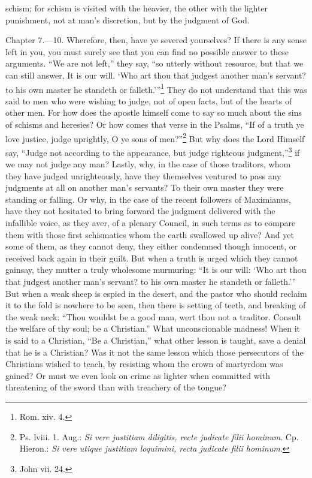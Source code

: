 schism; for schism is visited with the heavier, the other with the lighter punishment, not at man’s discretion, but by the judgment of God.


Chapter 7.—10. Wherefore, then, have ye severed yourselves? If there is any sense left in you, you must surely see that you can find no possible answer to these arguments. ``We are not left,'' they say, ``so utterly without resource, but that we can still answer, It is our will. ‘Who art thou that judgest another man’s servant? to his own master he standeth or falleth.’''\footnote{\par  Rom. xiv. 4.} They do not understand that this was said to men who were wishing to judge, not of open facts, but of the hearts of other men. For how does the apostle himself come to say so much about the sins of schisms and heresies? Or how comes that verse in the Psalms, ``If of a truth ye love justice, judge uprightly, O ye sons of men?''\footnote{\par  Ps. lviii. 1. Aug.: \emph{Si vere justitiam diligitis, recte judicate filii hominum}. Cp. Hieron.: \emph{Si vere utique justitiam loquimini, recta judicate filii hominum}.} But why does the Lord Himself say, ``Judge not according to the appearance, but judge righteous judgment,''\footnote{\par  John vii. 24.} if we may not judge any man? Lastly, why, in the case of those traditors, whom they have judged unrighteously, have they themselves ventured to pass any judgments at all on another man’s servants? To their own master they were standing or falling. Or why, in the case of the recent followers of Maximianus, have they not hesitated to bring forward the judgment delivered with the infallible voice, as they aver, of a plenary Council, in such terms as to compare them with those first schismatics whom the earth swallowed up alive? And yet some of them, as they cannot deny, they either condemned though innocent, or received back again in their guilt. But when a truth is urged which they cannot gainsay, they mutter a truly wholesome murmuring: ``It is our will: ‘Who art thou that judgest another man’s servant? to his own master he standeth or falleth.’'' But when a weak sheep is espied in the desert, and the pastor who should reclaim it to the fold is nowhere to be seen, then there is setting of teeth, and breaking of the weak neck: ``Thou wouldst be a good man, wert thou not a traditor. Consult the welfare of thy soul; be a Christian.'' What unconscionable madness! When it is said to a Christian, ``Be a Christian,'' what other lesson is taught, save a denial that he is a Christian? Was it not the same lesson which those persecutors of the Christians wished to teach, by resisting whom the crown of martyrdom was gained? Or must we even look on crime as lighter when committed with threatening of the sword than with treachery of the tongue?

